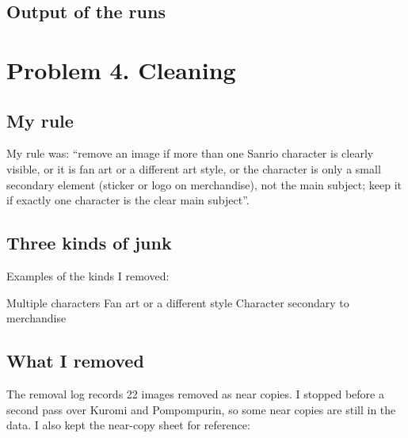 \documentclass[11pt]{article}
\begin{document}
\subsection*{Output of the runs}

\section*{Problem 4. Cleaning}

\subsection*{My rule}
My rule was: ``remove an image if more than one Sanrio character is clearly
visible, or it is fan art or a different art style, or the character is only
a small secondary element (sticker or logo on merchandise), not the main
subject; keep it if exactly one character is the clear main subject''.

\subsection*{Three kinds of junk}
Examples of the kinds I removed:

\begin{center}
\hfill
{}\hfill
{}
\end{center}
\begin{center}
Multiple characters \hfill Fan art or a different style \hfill
Character secondary to merchandise
\end{center}

\subsection*{What I removed}

The removal log records 22 images removed as near copies. I stopped before a
second pass over Kuromi and Pompompurin, so some near copies are still in the
data. I also kept the near-copy sheet for reference:
\end{document}
